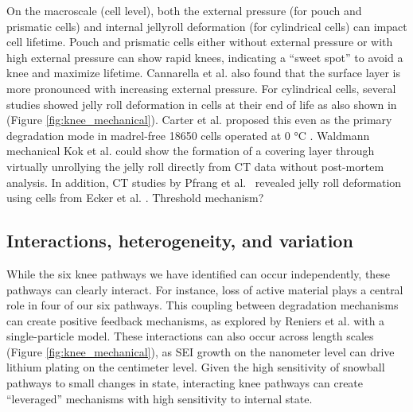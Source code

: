 \documentclass[journal=jpclcd,manuscript=article]{achemso}
\newcommand{\pbox}[1]{{
\fbox{
\parbox{0.8\textwidth}{  \fbox{$\triangleright$\textcolor{blue}{\textbf{Peter}:}} 
#1
}}}}
\begin{document}
On the macroscale (cell level), both the external pressure (for pouch and prismatic cells) and internal jellyroll deformation (for cylindrical cells) can impact cell lifetime. Pouch and prismatic cells either without external pressure\cite{wunsch_investigation_2019} or with high external pressure\cite{cannarella_stress_2014} can show rapid knees, indicating a ``sweet spot'' to avoid a knee and maximize lifetime. Cannarella et al.\cite{cannarella_stress_2014} also found that the surface layer is more pronounced with increasing external pressure.
For cylindrical cells, several studies showed jelly roll deformation in cells at their end of life as also shown in (Figure \ref{fig:knee_mechanical})\cite{willenberg_development_2020, willenberg_high-precision_2020}. Carter et al. proposed this even as the primary degradation mode in madrel-free 18650 cells operated at 0 °C \cite{carter_mechanical_2019}.
Waldmann mechanical \cite{waldmann_mechanical_2014}
Kok et al. \cite{kok_virtual_2019} could show the formation of a covering layer through virtually unrollying the jelly roll directly from CT data without post-mortem analysis.
In addition, CT studies by Pfrang et al.~\cite{pfrang_long-term_2018} revealed jelly roll deformation using cells from Ecker et al. \cite{ecker_calendar_2014}. Threshold mechanism?

\subsection{Interactions, heterogeneity, and variation}

\pbox{Not quite ready for editing, but close}

While the six knee pathways we have identified can occur independently, these pathways can clearly interact. For instance, loss of active material plays a central role in four of our six pathways. This coupling between degradation mechanisms can create positive feedback mechanisms, as explored by Reniers et al.\cite{reniers_review_2019} with a single-particle model. These interactions can also occur across length scales (Figure \ref{fig:knee_mechanical}), as SEI growth on the nanometer level can drive lithium plating on the centimeter level.
Given the high sensitivity of snowball pathways to small changes in state, interacting knee pathways can create “leveraged” mechanisms with high sensitivity to internal state.
\end{document}
